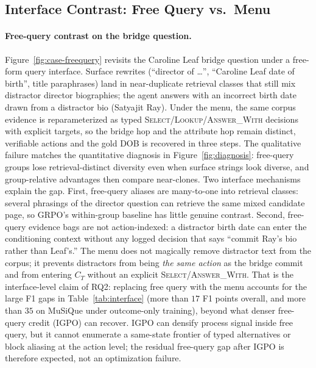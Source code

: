 \documentclass[letterpaper]{article} %
\begin{document}
\subsection{Interface Contrast: Free Query vs.\ Menu}

\paragraph{Free-query contrast on the bridge question.}
Figure~\ref{fig:case-freequery} revisits the Caroline Leaf bridge question under a free-form query interface.
Surface rewrites (``director of \ldots'', ``Caroline Leaf date of birth'', title paraphrases) land in near-duplicate retrieval classes that still mix distractor director biographies; the agent answers with an incorrect birth date drawn from a distractor bio (Satyajit Ray).
Under the menu, the same corpus evidence is reparameterized as typed \textsc{Select}/\textsc{Lookup}/\textsc{Answer\_With} decisions with explicit targets, so the bridge hop and the attribute hop remain distinct, verifiable actions and the gold DOB is recovered in three steps.
The qualitative failure matches the quantitative diagnosis in Figure~\ref{fig:diagnosis}: free-query groups lose retrieval-distinct diversity even when surface strings look diverse, and group-relative advantages then compare near-clones.
Two interface mechanisms explain the gap.
First, free-query aliases are many-to-one into retrieval classes: several phrasings of the director question can retrieve the same mixed candidate page, so GRPO's within-group baseline has little genuine contrast.
Second, free-query evidence bags are not action-indexed: a distractor birth date can enter the conditioning context without any logged decision that says ``commit Ray's bio rather than Leaf's.''
The menu does not magically remove distractor text from the corpus; it prevents distractors from being \emph{the same action} as the bridge commit and from entering $C_T$ without an explicit \textsc{Select}/\textsc{Answer\_With}.
That is the interface-level claim of RQ2: replacing free query with the menu accounts for the large F1 gaps in Table~\ref{tab:interface} (more than $17$ F1 points overall, and more than $35$ on MuSiQue under outcome-only training), beyond what denser free-query credit (IGPO) can recover.
IGPO can densify process signal inside free query, but it cannot enumerate a same-state frontier of typed alternatives or block aliasing at the action level; the residual free-query gap after IGPO is therefore expected, not an optimization failure.
\end{document}
